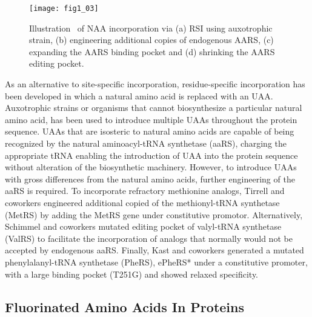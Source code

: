 \begin{refsection}
\begin{figure}[h!] \centering \texttt{[image: fig1\_03]} 
    \caption[Illustration  of NAA incorporation via (a) RSI using auxotrophic
    strain, (b) engineering additional copies of endogenous AARS, (c) expanding
the AARS binding pocket and (d) shrinking the AARS editing
pocket.]{Illustration  of NAA incorporation via (a) RSI using auxotrophic
strain, (b) engineering additional copies of endogenous AARS, (c) expanding the
AARS binding pocket and (d) shrinking the AARS editing pocket.} \label{fig:rsi}
\end{figure}

As an alternative to site-specific incorporation, residue-specific
incorporation has been developed in which a natural amino acid is replaced with
an UAA. Auxotrophic strains or organisms that cannot biosynthesize a particular
natural amino acid, has been used to introduce multiple UAAs throughout the
protein sequence. UAAs that are isosteric to natural amino acids are capable of
being recognized by the natural aminoacyl-tRNA synthetase (aaRS), charging the
appropriate tRNA enabling the introduction of UAA into the protein sequence
without alteration of the biosynthetic machinery. However, to introduce UAAs
with gross differences from the natural amino acids, further engineering of the
aaRS is required. To incorporate refractory methionine analogs, Tirrell and
coworkers engineered additional copied of the methionyl-tRNA synthetase (MetRS)
by adding the MetRS gene under constitutive promotor.\cite{Kiick2000}
Alternatively, Schimmel and coworkers mutated editing pocket of valyl-tRNA
synthetase (ValRS) to facilitate the incorporation of analogs that normally
would not be accepted by endogenous aaRS.\cite{Doring2001} Finally, Kast and
coworkers generated a mutated phenylalanyl-tRNA synthetase (PheRS), ePheRS*
under a constitutive promoter, with a large binding pocket (T251G) and showed
relaxed specificity.\cite{Kast1991}

\subsection{Fluorinated Amino Acids In Proteins} 
\label{sec:faa}


\end{refsection}
